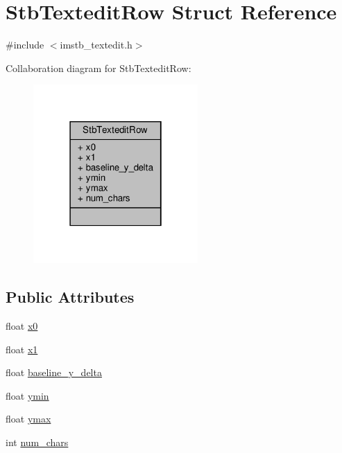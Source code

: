 \hypertarget{structStbTexteditRow}{}\section{Stb\+Textedit\+Row Struct Reference}
\label{structStbTexteditRow}


{\ttfamily \#include $<$imstb\+\_\+textedit.\+h$>$}



Collaboration diagram for Stb\+Textedit\+Row\+:
\nopagebreak
\begin{figure}[H]
\begin{center}
\leavevmode
\includegraphics[width=178pt]{structStbTexteditRow__coll__graph}
\end{center}
\end{figure}
\subsection*{Public Attributes}
\begin{DoxyCompactItemize}
\item 
float \hyperlink{structStbTexteditRow_af30b3e1d61d1acea26d3e0ebec2cb81d}{x0}
\item 
float \hyperlink{structStbTexteditRow_a3a3e1a506030c871a1b3d09bf26e341f}{x1}
\item 
float \hyperlink{structStbTexteditRow_ad2d72b74b1a61e331949c7f7ec311880}{baseline\+\_\+y\+\_\+delta}
\item 
float \hyperlink{structStbTexteditRow_a707d331bd9dc99d64c81f71106b75eed}{ymin}
\item 
float \hyperlink{structStbTexteditRow_aab290e15f6a3b4a96ab2c2472cc8a7a5}{ymax}
\item 
int \hyperlink{structStbTexteditRow_a1a19bebadb3f82b4f86ea29698d77084}{num\+\_\+chars}
\end{DoxyCompactItemize}


